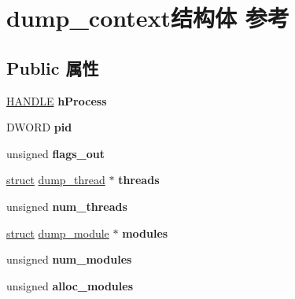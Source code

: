 \hypertarget{structdump__context}{}\section{dump\+\_\+context结构体 参考}
\label{structdump__context}
\subsection*{Public 属性}
\begin{DoxyCompactItemize}
\item 
\mbox{\label{structdump__context_a849c10f5c109bb57d65cb90286d582b8}} 
\hyperlink{interfacevoid}{H\+A\+N\+D\+LE} {\bfseries h\+Process}
\item 
\mbox{\label{structdump__context_a8651899d3cc4c9637db404a1cc6c3c9c}} 
D\+W\+O\+RD {\bfseries pid}
\item 
\mbox{\label{structdump__context_a03502815287a5f2f3a5e7c14a62584ef}} 
unsigned {\bfseries flags\+\_\+out}
\item 
\mbox{\label{structdump__context_ab975c568b6fbc5e14661b3a2ee06660b}} 
\hyperlink{interfacestruct}{struct} \hyperlink{structdump__thread}{dump\+\_\+thread} $\ast$ {\bfseries threads}
\item 
\mbox{\label{structdump__context_a2d1d1a0c273714c5e84b988e8361d2e9}} 
unsigned {\bfseries num\+\_\+threads}
\item 
\mbox{\label{structdump__context_ac24e994da3337ec8301d5b5e3c4f0538}} 
\hyperlink{interfacestruct}{struct} \hyperlink{structdump__module}{dump\+\_\+module} $\ast$ {\bfseries modules}
\item 
\mbox{\label{structdump__context_a13229f5c777a488f0b66870f03c4f0b2}} 
unsigned {\bfseries num\+\_\+modules}
\item 
\mbox{\label{structdump__context_ac5d217b6c6222d6cffdf73b8e61cd373}} 
unsigned {\bfseries alloc\+\_\+modules}
\item 
\mbox{\label{structdump__context_a382b7b7895b60cb1454e61ac8ce3b27a}} 

\end{DoxyCompactItemize}
